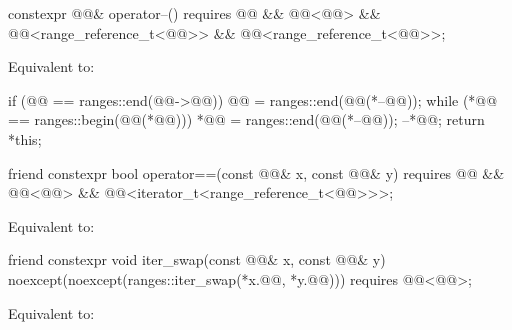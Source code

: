 %
\begin{itemdecl}
constexpr @@& operator--()
  requires @@ && @@<@@> &&
           @@<range_reference_t<@@>> &&
           @@<range_reference_t<@@>>;
\end{itemdecl}

\begin{itemdescr}
\pnum
\effects
Equivalent to:
\begin{codeblock}
if (@@ == ranges::end(@@->@@))
  @@ = ranges::end(@@(*--@@));
while (*@@ == ranges::begin(@@(*@@)))
  *@@ = ranges::end(@@(*--@@));
--*@@;
return *this;
\end{codeblock}
\end{itemdescr}

%
\begin{itemdecl}
friend constexpr bool operator==(const @@& x, const @@& y)
  requires @@ && @@<@@> &&
           @@<iterator_t<range_reference_t<@@>>>;
\end{itemdecl}

\begin{itemdescr}
\pnum
\effects
Equivalent to:
\end{itemdescr}

%
\begin{itemdecl}
friend constexpr void iter_swap(const @@& x, const @@& y)
  noexcept(noexcept(ranges::iter_swap(*x.@@, *y.@@)))
  requires @@<@@>;
\end{itemdecl}

\begin{itemdescr}
\pnum
\effects
Equivalent to: 
\end{itemdescr}

